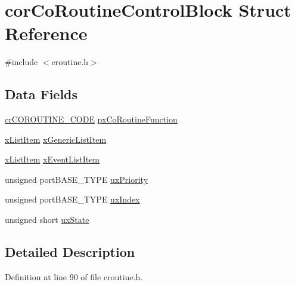 \hypertarget{structcor_co_routine_control_block}{\section{cor\-Co\-Routine\-Control\-Block Struct Reference}
\label{structcor_co_routine_control_block}
}


{\ttfamily \#include $<$croutine.\-h$>$}

\subsection*{Data Fields}
\begin{DoxyCompactItemize}
\item 
\hyperlink{win32_2win32_2_libraries_2_free_r_t_o_s_2_source_2include_2croutine_8h_a6e4eab2099c619436f180f021787779b}{cr\-C\-O\-R\-O\-U\-T\-I\-N\-E\-\_\-\-C\-O\-D\-E} \hyperlink{structcor_co_routine_control_block_acc98c7364cd88e8e034a5f9bba113832}{px\-Co\-Routine\-Function}
\item 
\hyperlink{_common_2_libraries_2_free_r_t_o_s_2_source_2include_2list_8h_abc3e65a10b5c5f39142e64e69311797f}{x\-List\-Item} \hyperlink{structcor_co_routine_control_block_ad088a2410ffd125ce32562e2faa4861d}{x\-Generic\-List\-Item}
\item 
\hyperlink{_common_2_libraries_2_free_r_t_o_s_2_source_2include_2list_8h_abc3e65a10b5c5f39142e64e69311797f}{x\-List\-Item} \hyperlink{structcor_co_routine_control_block_ae3df50ba6714e9c2683cefa31dc0bc50}{x\-Event\-List\-Item}
\item 
unsigned port\-B\-A\-S\-E\-\_\-\-T\-Y\-P\-E \hyperlink{structcor_co_routine_control_block_af736666edff352eba690b3a5878bbdde}{ux\-Priority}
\item 
unsigned port\-B\-A\-S\-E\-\_\-\-T\-Y\-P\-E \hyperlink{structcor_co_routine_control_block_a9f4a873d7b5447f3677639080c8f5f51}{ux\-Index}
\item 
unsigned short \hyperlink{structcor_co_routine_control_block_adb706fe642d1c39528402ec6393fcaa9}{ux\-State}
\end{DoxyCompactItemize}


\subsection{Detailed Description}


Definition at line 90 of file croutine.\-h.




